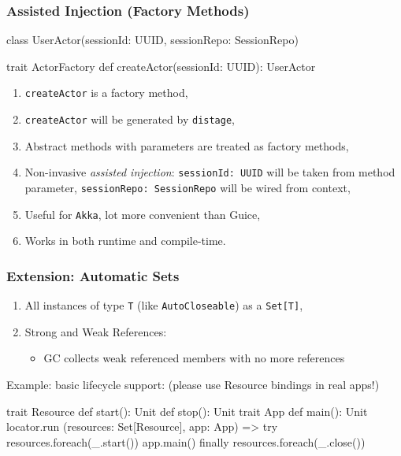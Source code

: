 \documentclass[usenames,dvipsnames]{beamer}
\newcommand{\distage}{\texttt{distage}\xspace}
\begin{document}
\begin{frame}[fragile]
  \frametitle{Assisted Injection (Factory Methods)}
  \begin{scalacode}
class UserActor(sessionId: UUID, sessionRepo: SessionRepo)

trait ActorFactory {
  def createActor(sessionId: UUID): UserActor
}
  \end{scalacode}

  \begin{enumerate}
    \item \texttt{createActor} is a factory method,
    \item \texttt{createActor} will be generated by \distage,
    \item Abstract methods with parameters are treated as factory methods,
    \item Non-invasive \textit{assisted injection}: \texttt{sessionId: UUID} will be taken from method parameter, \texttt{sessionRepo: SessionRepo} will be wired from context,
    \item Useful for \texttt{Akka}, lot more convenient than Guice,
    \item Works in both runtime and compile-time.
  \end{enumerate}
\end{frame}

\begin{frame}[fragile]
  \frametitle{Extension: Automatic Sets}

  \begin{enumerate}
    \item All instances of type \texttt{T} (like \texttt{AutoCloseable}) as a \texttt{Set[T]},
    \item Strong and Weak References:
      \begin{itemize}
        \item GC collects weak referenced members with no more references
      \end{itemize}
  \end{enumerate}

  Example: basic lifecycle support:
  (please use Resource bindings in real apps!)

  \begin{scalacode}
trait Resource {
  def start(): Unit
  def stop(): Unit
}
trait App { def main(): Unit }
locator.run { (resources: Set[Resource], app: App) =>
  try {
    resources.foreach(_.start())
    app.main()
  } finally { resources.foreach(_.close()) }
}
  \end{scalacode}
\end{frame}
\end{document}
